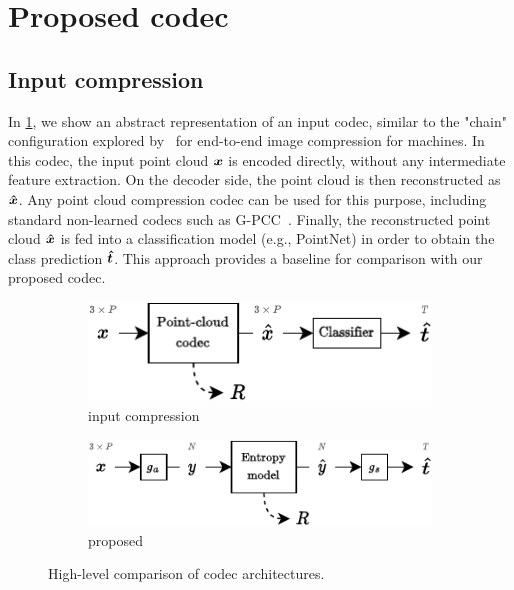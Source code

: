 \section{Proposed codec}
\label{sec:proposed-codec}

\subsection{Input compression}

In \cref{fig:arch-comparison/input-compression}, we show an abstract representation of an input codec, similar to the "chain" configuration explored by~\cite{chamain2020endtoend} for end-to-end image compression for machines.
In this codec, the input point cloud ${\boldsymbol{x}}$ is encoded directly, without any intermediate feature extraction.
On the decoder side, the point cloud is then reconstructed as ${\boldsymbol{\hat{x}}}$.
Any point cloud compression codec can be used for this purpose, including standard non-learned codecs such as G-PCC~\cite{mpeg2019gpccv2}.
Finally, the reconstructed point cloud ${\boldsymbol{\hat{x}}}$ is fed into a classification model (e.g., PointNet) in order to obtain the class prediction ${\boldsymbol{\hat{t}}}$.
This approach provides a baseline for comparison with our proposed codec.

\begin{figure}[tbp]
  \centering
  \begin{subfigure}[b]{0.53\linewidth}
    \centering
    \includegraphics[width=\linewidth]{img/point_cloud_compression/arch/input-compression.pdf}
    \caption{input compression}
    \label{fig:arch-comparison/input-compression}
  \end{subfigure}%
  \vspace{1.5\baselineskip}
  \begin{subfigure}[b]{0.62\linewidth}
    \centering
    \includegraphics[width=\linewidth]{img/point_cloud_compression/arch/proposed.pdf}
    \caption{proposed}
    \label{fig:arch-comparison/proposed}
  \end{subfigure}%
  \caption{High-level comparison of codec architectures.}
  \label{fig:arch-comparison}
\end{figure}



